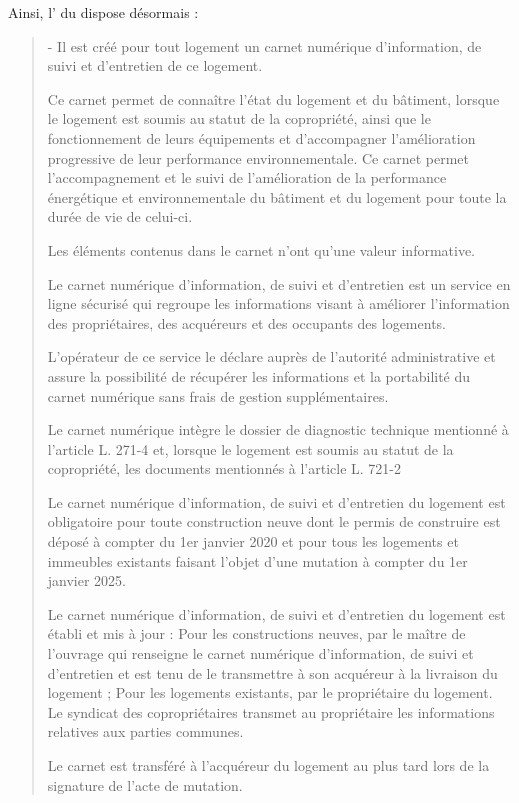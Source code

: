 			Ainsi, l’ du \CCH{} dispose désormais :
			\begin{quote}
				\I{} - Il est créé pour tout logement un carnet numérique d'information, de suivi et d'entretien de
				ce logement.
				
				Ce carnet permet de connaître l'état du logement et du bâtiment, lorsque le logement est soumis au
				statut de la copropriété, ainsi que le fonctionnement de leurs équipements et d'accompagner
				l'amélioration progressive de leur performance environnementale. Ce carnet permet l'accompagnement
				et le suivi de l'amélioration de la performance énergétique et environnementale du bâtiment et du
				logement pour toute la durée de vie de celui-ci.
				
				Les éléments contenus dans le carnet n'ont qu'une valeur informative.
				
				Le carnet numérique d'information, de suivi et d'entretien est un service en ligne sécurisé qui regroupe les
				informations visant à améliorer l'information des propriétaires, des acquéreurs et des occupants des
				logements.
				
				L'opérateur de ce service le déclare auprès de l'autorité administrative et assure la possibilité de
				récupérer les informations et la portabilité du carnet numérique sans frais de gestion supplémentaires.
				
				Le carnet numérique intègre le dossier de diagnostic technique mentionné à l'article L. 271-4 et, lorsque
				le logement est soumis au statut de la copropriété, les documents mentionnés à l'article L. 721-2
				
				Le carnet numérique d'information, de suivi et d'entretien du logement est obligatoire pour toute
				construction neuve dont le permis de construire est déposé à compter du 1er janvier 2020 et pour tous les
				logements et immeubles existants faisant l'objet d'une mutation à compter du 1er janvier 2025.
				
				Le carnet numérique d'information, de suivi et d'entretien du logement est établi et mis à jour :
				\degre{} Pour les constructions neuves, par le maître de l'ouvrage qui renseigne le carnet numérique
				d'information, de suivi et d'entretien et est tenu de le transmettre à son acquéreur à la livraison du
				logement ;
				\degre{} Pour les logements existants, par le propriétaire du logement. Le syndicat des copropriétaires
				transmet au propriétaire les informations relatives aux parties communes.
				
				Le carnet est transféré à l'acquéreur du logement au plus tard lors de la signature de l'acte de
				mutation.
			\end{quote}
			
